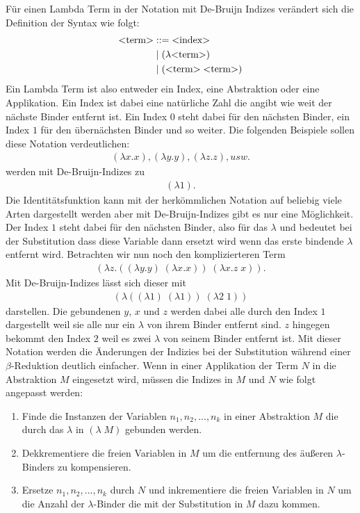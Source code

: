 \documentclass[ngerman]{article}
\begin{document}
Für einen Lambda Term in der Notation mit De-Bruijn Indizes verändert sich die Definition der Syntax wie folgt:
\begin{align*}
    \text{\textless term\textgreater} & ::= \text{\textless index\textgreater} \\
                      & \; | \; ( \lambda \text{\textless term\textgreater} )\\
                      & \; | \; (\text{\textless term\textgreater} \; \text{\textless term\textgreater})
\end{align*}
Ein Lambda Term ist also entweder ein Index, eine Abstraktion oder eine Applikation. Ein Index ist dabei eine natürliche Zahl die angibt wie weit der nächste Binder entfernt ist. Ein Index $0$ steht dabei für den nächsten Binder, ein Index $1$ für den übernächsten Binder und so weiter. Die folgenden Beispiele sollen diese Notation verdeutlichen:
\begin{align*}
    (\lambda x.x), (\lambda y.y), (\lambda z.z), usw.
\end{align*}
werden mit De-Bruijn-Indizes zu
\begin{align*}
    (\lambda 1).
\end{align*}
Die Identitätsfunktion kann mit der herkömmlichen Notation auf beliebig viele Arten dargestellt werden aber mit De-Bruijn-Indizes gibt es nur eine Möglichkeit. Der Index $1$ steht dabei für den nächsten Binder, also für das $\lambda$ und bedeutet bei der Substitution dass diese Variable dann ersetzt wird wenn das erste bindende $\lambda$ entfernt wird. 
Betrachten wir nun noch den komplizierteren Term
\begin{align*}
    (\lambda z.((\lambda y.y) \; (\lambda x.x)) \; (\lambda x.z \; x)).
\end{align*}
Mit De-Bruijn-Indizes lässt sich dieser mit
\begin{align*}
    (\lambda ((\lambda 1) \; (\lambda 1)) \; (\lambda 2 \; 1))
\end{align*}
darstellen. Die gebundenen $y$, $x$ und $z$ werden dabei alle durch den Index $1$ dargestellt weil sie alle nur ein $\lambda$ von ihrem Binder entfernt sind. $z$ hingegen bekommt den Index $2$ weil es zwei $\lambda$ von seinem Binder entfernt ist.
Mit dieser Notation werden die Änderungen der Indizies bei der Substitution während einer $\beta$-Reduktion deutlich einfacher. Wenn in einer Applikation der Term $N$ in die Abstraktion $M$ eingesetzt wird, müssen die Indizes in $M$ und $N$ wie folgt angepasst werden:
\begin{enumerate}
    \item Finde die Instanzen der Variablen $n_1, n_2, ..., n_k$ in einer Abstraktion $M$ die durch das $\lambda$ in $(\lambda \; M)$ gebunden werden.
    \item Dekkrementiere die freien Variablen in $M$ um die entfernung des äußeren $\lambda$-Binders zu kompensieren.
    \item Ersetze $n_1, n_2, ..., n_k$ durch $N$ und inkrementiere die freien Variablen in $N$ um die Anzahl der $\lambda$-Binder die mit der Substitution in $M$ dazu kommen.
\end{enumerate}
\end{document}
